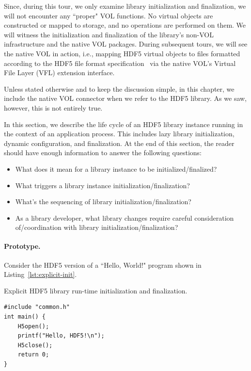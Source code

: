 Since, during this tour, we only examine library initialization and finalization, we will not encounter any ``proper" VOL functions. No virtual objects are constructed or mapped to storage, and no operations are performed on them. We will witness the initialization and finalization of the library's non-VOL infrastructure and the native VOL packages. During subsequent tours, we will see the native VOL in action, i.e., mapping HDF5 virtual objects to files formatted according to the HDF5 file format specification~\cite{ffmt} via the native VOL's Virtual File Layer (VFL) extension interface.

Unless stated otherwise and to keep the discussion simple, in this chapter, we include the native VOL connector when we refer to the HDF5 library. As we saw, however, this is not entirely true.

In this section, we describe the life cycle of an HDF5 library instance running in the context of an application process. This includes lazy library initialization, dynamic configuration, and finalization. At the end of this section, the reader should have enough information to answer the following questions:

\begin{itemize}
    \item What does it mean for a library instance to be initialized/finalized?
    \item What triggers a library instance initialization/finalization?
    \item What's the sequencing of library initialization/finalization?
    \item As a library developer, what library changes require careful consideration of/coordination with library initialization/finalization?
\end{itemize}

\paragraph{Prototype.} Consider the HDF5 version of a ``Hello, World!" program shown in Listing~\ref{lst:explicit-init}.

\begin{listing}[H]
\caption{Explicit HDF5 library run-time initialization and finalization.}
\label{lst:explicit-init}
\begin{verbatim}
#include "common.h"
int main() {
    H5open();
    printf("Hello, HDF5!\n");
    H5close();
    return 0;
}
\end{verbatim}
\end{listing}

